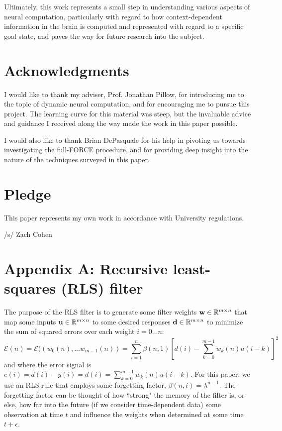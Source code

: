 \documentclass[12pt,a4paper,final]{iopart}
\begin{document}
Ultimately, this work represents a small step in understanding various aspects of neural computation, particularly with regard to how context-dependent information in the brain is computed and represented with regard to a specific goal state, and paves the way for future research into the subject.

\newpage

\section*{Acknowledgments}
I would like to thank my adviser, Prof. Jonathan Pillow, for introducing me to the topic of dynamic neural computation, and for encouraging me to pursue this project. The learning curve for this material was steep, but the invaluable advice and guidance I received along the way made the work in this paper possible. 

I would also like to thank Brian DePasquale for his help in pivoting us towards investigating the full-FORCE procedure, and for providing deep insight into the nature of the techniques surveyed in this paper.

\medskip

\section*{Pledge}
This paper represents my own work in accordance with University regulations.

/s/ Zach Cohen

\printbibliography


\newpage

\section*{Appendix A: Recursive least-squares (RLS) filter}
The purpose of the RLS filter is to generate some filter weights ${\bf w} \in \mathbb{R}^{m \times n}$ that map some inputs ${\bf u} \in \mathbb{R}^{m \times n}$ to some desired responses ${\bf d} \in \mathbb{R}^{m \times n}$ to minimize the sum of squared errors over each weight $i = 0\dots n$:
\[
    \mathcal{E}(n) = \mathcal{E}((w_0(n), \dots w_{m-1}(n)) = \sum_{i = 1}^n \beta(n, 1)[d(i) - \sum_{k = 0}^{m - 1}w_k(n)u(i-k)]^2
\]
and where the error signal is $e(i) = d(i) - y(i) = d(i) = \sum_{k=0}^{m-1} w_k(n)u(i-k)$. For this paper, we use an RLS rule that employs some forgetting factor, $\beta(n,i) = \lambda^{n-1}$. The forgetting factor can be thought of how ``strong" the memory of the filter is, or else, how far into the future (if we consider time-dependent data) some observation at time $t$ and influence the weights when determined at some time $t + \epsilon$. 
\end{document}
